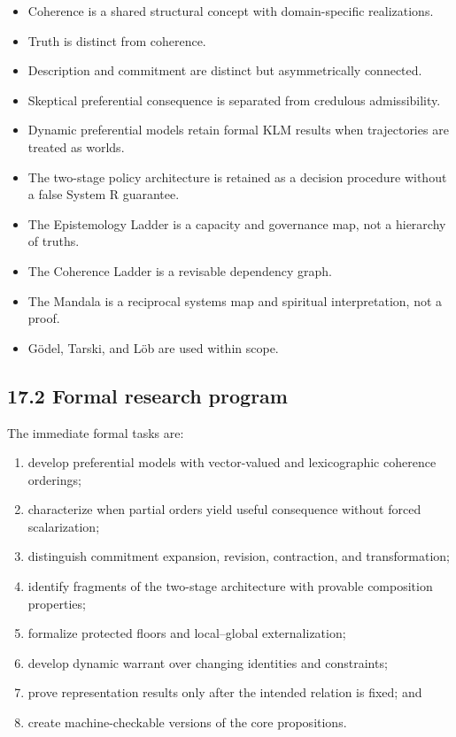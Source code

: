 \documentclass[
  11pt,
]{article}
\providecommand{\tightlist}{%
  \setlength{\itemsep}{0pt}\setlength{\parskip}{0pt}}
\begin{document}
\begin{itemize}
\tightlist
\item
  Coherence is a shared structural concept with domain-specific
  realizations.
\item
  Truth is distinct from coherence.
\item
  Description and commitment are distinct but asymmetrically connected.
\item
  Skeptical preferential consequence is separated from credulous
  admissibility.
\item
  Dynamic preferential models retain formal KLM results when
  trajectories are treated as worlds.
\item
  The two-stage policy architecture is retained as a decision procedure
  without a false System R guarantee.
\item
  The Epistemology Ladder is a capacity and governance map, not a
  hierarchy of truths.
\item
  The Coherence Ladder is a revisable dependency graph.
\item
  The Mandala is a reciprocal systems map and spiritual interpretation,
  not a proof.
\item
  Gödel, Tarski, and Löb are used within scope.
\end{itemize}

\subsection{17.2 Formal research program}\label{formal-research-program}

The immediate formal tasks are:

\begin{enumerate}
\def\labelenumi{\arabic{enumi}.}
\tightlist
\item
  develop preferential models with vector-valued and lexicographic
  coherence orderings;
\item
  characterize when partial orders yield useful consequence without
  forced scalarization;
\item
  distinguish commitment expansion, revision, contraction, and
  transformation;
\item
  identify fragments of the two-stage architecture with provable
  composition properties;
\item
  formalize protected floors and local--global externalization;
\item
  develop dynamic warrant over changing identities and constraints;
\item
  prove representation results only after the intended relation is
  fixed; and
\item
  create machine-checkable versions of the core propositions.
\end{enumerate}
\end{document}
